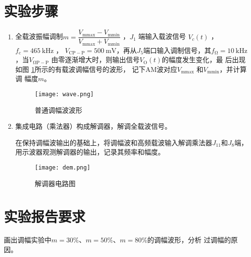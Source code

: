 \documentclass[../main]{subfiles}
\begin{document}
\section{实验步骤}%
\label{sec:\arabic{chapter}实验步骤}

\begin{enumerate}

	\item 全载波振幅调制$ m = \dfrac{V_\mathrm{mmax} - V_\mathrm{mmin}}
		{V_\mathrm{mmax} + V_\mathrm{mmin}} $ ，$ J_1 $ 端输入载波信号 $
		V_c(t) $ ，$ f_\mathrm{c} = \SI{465}{\kHz} $ ， $ V_\mathrm{CP -
		P} = \SI{500}{\mV} $，再从$ J_5 $端口输入调制信号，其$
		f_\mathrm{\Omega} = \SI{10}{\kHz} $，当$ V_\mathrm{\Omega P-P} $
		由零逐渐增大时，则输出信号$ V_\mathrm{O}(t) $的幅度发生变化，最
		后出现如图 \ref{fig:普通调幅波波形}所示的有载波调幅信号的波形，
		记下AM波对应$ V_\mathrm{mmax} $ 和$ V_\mathrm{mmin} $，并计算调
		幅度$ m $。

		\begin{figure}[htbp]
			\centering
			\texttt{[image: wave.png]}
			\caption{普通调幅波波形}
			\label{fig:普通调幅波波形}
		\end{figure}

	\item 集成电路（乘法器）构成解调器，解调全载波信号。

		在保持调幅波输出的基础上，将调幅波和高频载波输入解调乘法器$
		J_\mathrm{11} $和$ J_8 $端，用示波器观测解调器的输出，记录其频率和幅度。

		\begin{figure}[htbp]
			\centering
			\texttt{[image: dem.png]}
			\caption{解调器电路图}
			\label{fig:解调器电路图}
		\end{figure}

\end{enumerate}

\section{实验报告要求}%
\label{sec:\arabic{chapter}实验报告要求}

\begin{Exercise}

	画出调幅实验中$ m = 30\% $、$ m = 50\% $、$ m = 80\% $的调幅波形，分析
	过调幅的原因。

\end{Exercise}
\end{document}
